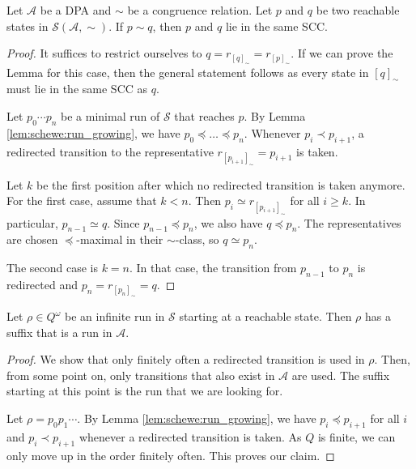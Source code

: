\begin{lem}
	Let $\mathcal{A}$ be a DPA and $\sim$ be a congruence relation. Let $p$ and $q$ be two reachable states in $\mathcal{S}(\mathcal{A}, \sim)$. If $p \sim q$, then $p$ and $q$ lie in the same SCC. 
\end{lem}

\begin{proof}
	It suffices to restrict ourselves to $q = r_{[q]_\sim} = r_{[p]_\sim}$. If we can prove the Lemma for this case, then the general statement follows as every state in $[q]_\sim$ must lie in the same SCC as $q$.
	
	Let $p_0 \cdots p_n$ be a minimal run of $\mathcal{S}$ that reaches $p$. By Lemma \ref{lem:schewe:run_growing}, we have $p_0 \preceq \dots \preceq p_n$. Whenever $p_i \prec p_{i+1}$, a redirected transition to the representative $r_{[p_{i+1}]_\sim} = p_{i+1}$ is taken. 
	
	Let $k$ be the first position after which no redirected transition is taken anymore. For the first case, assume that $k < n$. Then $p_i \simeq r_{[p_{i+1}]_\sim}$ for all $i \geq k$. In particular, $p_{n-1} \simeq q$. Since $p_{n-1} \preceq p_n$, we also have $q \preceq p_n$. The representatives are chosen $\preceq$-maximal in their $\sim$-class, so $q \simeq p_n$.
	
	The second case is $k = n$. In that case, the transition from $p_{n-1}$ to $p_n$ is redirected and $p_n = r_{[p_n]_\sim} = q$.
\end{proof}


\begin{lem}
\label{lem:schewe:run_suffix}
	Let $\rho \in Q^\omega$ be an infinite run in $\mathcal{S}$ starting at a reachable state. Then $\rho$ has a suffix that is a run in $\mathcal{A}$.
\end{lem} 

\begin{proof}
	We show that only finitely often a redirected transition is used in $\rho$. Then, from some point on, only transitions that also exist in $\mathcal{A}$ are used. The suffix starting at this point is the run that we are looking for.
	
	Let $\rho = p_0 p_1 \cdots$. By Lemma \ref{lem:schewe:run_growing}, we have $p_i \preceq p_{i+1}$ for all $i$ and $p_i \prec p_{i+1}$ whenever a redirected transition is taken. As $Q$ is finite, we can only move up in the order finitely often. This proves our claim.
\end{proof}


